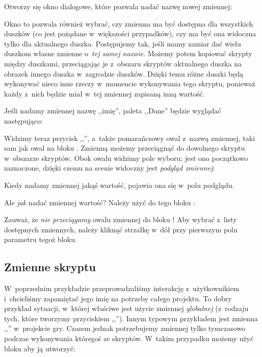 \documentclass[a4paper]{report}
\begin{document}

Otworzy się okno dialogowe, które pozwala nadać nazwę nowej zmiennej:\nopagebreak


Okno to pozwala również wybrać, czy zmienna ma być dostępna dla wszystkich duszków (co jest pożądane w~większości przypadków), czy ma być ona widoczna tylko dla aktualnego duszka. Postępujemy tak, jeśli mamy zamiar dać wielu duszkom własne zmienne o~\emph{tej samej nazwie}. Możemy potem kopiować skrypty między duszkami, przeciągając je z~obszaru skryptów aktualnego duszka na obrazek innego duszka w~zagrodzie duszków. Dzięki temu różne duszki będą wykonywać nieco inne rzeczy w~momencie wykonywania tego skryptu, ponieważ każdy z~nich będzie miał w~tej zmiennej zapisaną inną wartość.

Jeśli nadamy zmiennej nazwę ,,imię'', paleta ,,Dane'' będzie wyglądać następująco:\nopagebreak


Widzimy teraz przycisk ,,'', a~także pomarańczowy owal z~nazwą zmiennej, taki sam jak owal na bloku . Zmienną możemy przeciągnąć do dowolnego skryptu w~obszarze skryptów. Obok owalu widzimy pole wyboru; jest ono początkowo zaznaczone, dzięki czemu na scenie widoczny jest \emph{podgląd zmiennej}:\nopagebreak


Kiedy nadamy zmiennej jakąś wartość, pojawia ona się w~polu podglądu.

Ale \emph{jak} nadać zmiennej wartość? Należy użyć do tego bloku :\nopagebreak


Zauważ, że \emph{nie przeciągamy} owalu zmiennej do bloku ! Aby wybrać z~listy dostępnych zmiennych, należy kliknąć strzałkę w~dół przy pierwszym polu parametru tegoż bloku.

\subsection{Zmienne skryptu}

W~poprzednim przykładzie przeprowadzaliśmy interakcję z~użytkownikiem i~chcieliśmy zapamiętać jego imię na potrzeby całego projektu. To dobry przykład sytuacji, w~której właściwe jest użycie zmiennej \emph{globalnej} (z~rodzaju tych, które tworzymy przyciskiem ,,''). Innym typowym przykładem jest zmienna ,,'' w~projekcie gry. Czasem jednak potrzebujemy zmiennej tylko tymczasowo podczas wykonywania któregoś ze skryptów. W~takim przypadku możemy użyć bloku  aby ją utworzyć:\nopagebreak
\end{document}

